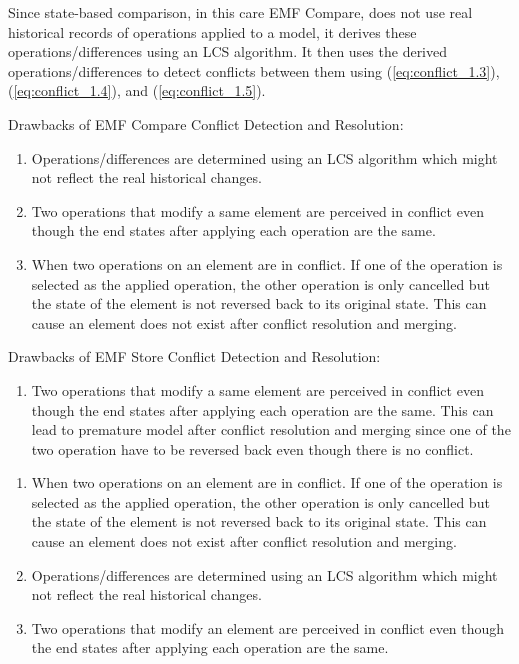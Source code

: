 Since state-based comparison, in this care EMF Compare, does not use real historical records of operations applied to a model, it derives these operations/differences using an LCS algorithm.  It then uses the derived operations/differences to detect conflicts between them using (\ref{eq:conflict_1.3}), (\ref{eq:conflict_1.4}), and (\ref{eq:conflict_1.5}).  

Drawbacks of EMF Compare Conflict Detection and Resolution:

\begin{enumerate}
    \item Operations/differences are determined using an LCS algorithm which might not reflect the real historical changes.
    \item Two operations that modify a same element are perceived in conflict even though the end states after applying each operation are the same. 
    \item When two operations on an element are in conflict. If one of the operation is selected as the applied operation, the other operation is only cancelled but the state of the element is not reversed back to its original state. This can cause an element does not exist after conflict resolution and merging.
\end{enumerate}

Drawbacks of EMF Store Conflict Detection and Resolution:
\begin{enumerate} 
    \item Two operations that modify a same element are perceived in conflict even though the end states after applying each operation are the same. This can lead to premature model after conflict resolution and merging since one of the two operation have to be reversed back even though there is no conflict.
\end{enumerate}

\begin{enumerate}
    \item When two operations on an element are in conflict. If one of the operation is selected as the applied operation, the other operation is only cancelled but the state of the element is not reversed back to its original state. This can cause an element does not exist after conflict resolution and merging.
    \item Operations/differences are determined using an LCS algorithm which might not reflect the real historical changes.
    \item Two operations that modify an element are perceived in conflict even though the end states after applying each operation are the same. 
\end{enumerate}

